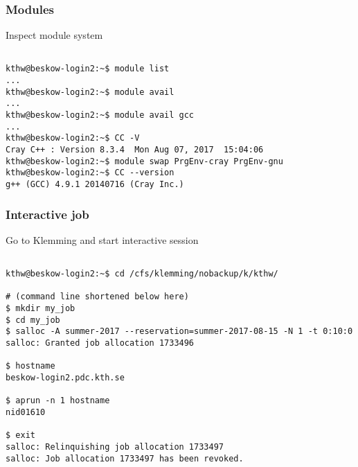 \begin{frame}[fragile]
  \frametitle{Modules}
  \begin{alertblock}{Inspect module system}
    \verbatimfont{\footnotesize}
    \begin{verbatim}

kthw@beskow-login2:~$ module list
...
kthw@beskow-login2:~$ module avail
...
kthw@beskow-login2:~$ module avail gcc
...
kthw@beskow-login2:~$ CC -V
Cray C++ : Version 8.3.4  Mon Aug 07, 2017  15:04:06
kthw@beskow-login2:~$ module swap PrgEnv-cray PrgEnv-gnu
kthw@beskow-login2:~$ CC --version
g++ (GCC) 4.9.1 20140716 (Cray Inc.)

 \end{verbatim}
\end{alertblock}



\end{frame}



\begin{frame}[fragile]
  \frametitle{Interactive job}
  \begin{alertblock}{Go to Klemming and start interactive session}
    \verbatimfont{\footnotesize}
    \begin{verbatim}

kthw@beskow-login2:~$ cd /cfs/klemming/nobackup/k/kthw/

# (command line shortened below here)
$ mkdir my_job
$ cd my_job
$ salloc -A summer-2017 --reservation=summer-2017-08-15 -N 1 -t 0:10:0
salloc: Granted job allocation 1733496

$ hostname
beskow-login2.pdc.kth.se

$ aprun -n 1 hostname
nid01610

$ exit
salloc: Relinquishing job allocation 1733497
salloc: Job allocation 1733497 has been revoked.

 \end{verbatim}
\end{alertblock}



\end{frame}



